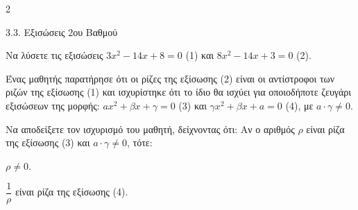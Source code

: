 \begin{ylh}{2}
    \item 3.3. Εξισώσεις 2ου Βαθμού
\end{ylh}

\begin{alist}
\item Να λύσετε τις εξισώσεις $3x^2 - 14x + 8 = 0$ (1) και $8x^2 - 14x + 3 = 0$ (2). 
\item Ένας μαθητής παρατήρησε ότι οι ρίζες της εξίσωσης (2) είναι οι αντίστροφοι των ριζών της εξίσωσης (1) και ισχυρίστηκε ότι το ίδιο θα ισχύει για οποιοδήποτε ζευγάρι εξισώσεων της μορφής: $a x^2 + \beta x + \gamma = 0$ (3) και $\gamma x^2 + \beta x + a = 0$ (4), με $a \cdot \gamma \neq 0$.

 Να αποδείξετε τον ισχυρισμό του μαθητή, δείχνοντας ότι: Αν ο αριθμός $\rho$ είναι ρίζα της εξίσωσης (3) και $a \cdot \gamma \neq 0$, τότε:

\begin{rlist}
\item $\rho \neq 0$. 
\item $\dfrac{1}{\rho}$ είναι ρίζα της εξίσωσης (4). 
\end{rlist}
\end{alist}

